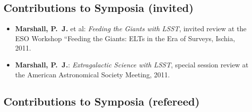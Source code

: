 \vspace{2\baselineskip}


\subsection*{Contributions to Symposia (invited)}

\begin{itemize}

\item{\textbf{Marshall, P.~J.} et al:
\textit{Feeding the Giants with LSST},
invited review at the {ESO Workshop ``Feeding the Giants: ELTs in the Era of Surveys}, Ischia, 2011.
}

\item{\textbf{Marshall, P.~J.}:
\textit{Extragalactic Science with LSST},
special session review at the {American Astronomical Society Meeting}, 2011.
}

\end{itemize}

\vspace{2\baselineskip}


\subsection*{Contributions to Symposia (refereed)}


